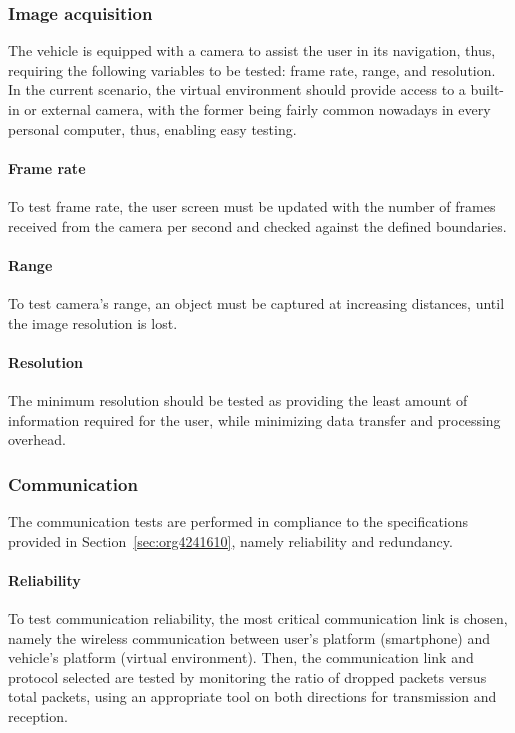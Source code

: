 \subsubsection{Image acquisition}%
\label{sec:orgb1f5c2a}
The vehicle is equipped with a camera to assist the user in its navigation,
thus, requiring the following variables to be tested: frame rate, range, and
resolution. In the current scenario, the virtual environment should provide
access to a built-in or external camera, with the former being fairly common
nowadays in every personal computer, thus, enabling easy testing.

\paragraph{Frame rate}%
\label{sec:frame-rate-test}
To test frame rate, the user screen must be updated with the number of frames
received from the camera per second and checked against the defined boundaries.

\paragraph{Range}%
\label{sec:range-test}
To test camera's range, an object must be captured at increasing distances, until the image resolution is lost.

\paragraph{Resolution}%
\label{sec:resolution-test}
The minimum resolution should be tested as providing the least amount of
information required for the user, while minimizing data transfer and processing overhead.

\subsubsection{Communication}%
\label{sec:comm-tests}
The communication tests are performed in compliance to the specifications
provided in Section~\ref{sec:org4241610}, namely reliability and redundancy.

\paragraph{Reliability}%
\label{sec:comm-reliability-test}
To test communication reliability, the most critical communication link is
chosen, namely the wireless communication between user's platform (smartphone)
and vehicle's platform (virtual environment). Then, the communication link and
protocol selected are tested by monitoring the ratio of dropped packets versus
total packets, using an appropriate tool on both directions for transmission and reception.

